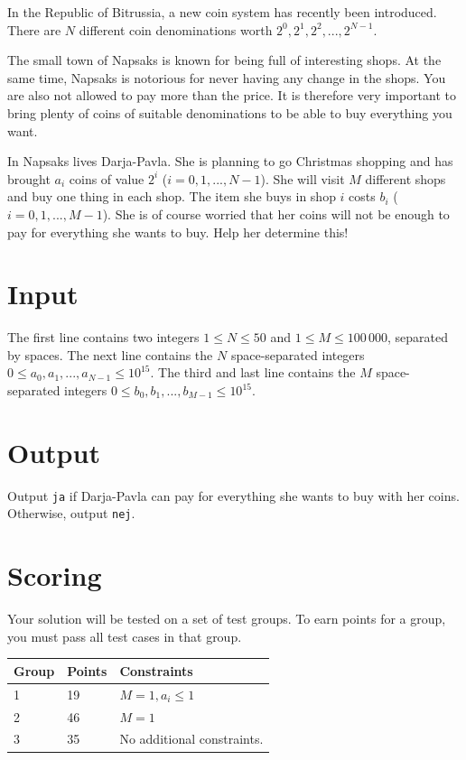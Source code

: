 In the Republic of Bitrussia, a new coin system has recently been introduced.
There are $N$ different coin denominations worth $2^0, 2^1, 2^2, ..., 2^{N-1}$.

The small town of Napsaks is known for being full of interesting shops.
At the same time, Napsaks is notorious for never having any change in the shops.
You are also not allowed to pay more than the price.
It is therefore very important to bring plenty of coins of suitable denominations to be able to buy everything you want.

In Napsaks lives Darja-Pavla.
She is planning to go Christmas shopping and has brought $a_i$ coins of value $2^i$ ($i = 0, 1, ..., N-1$).
She will visit $M$ different shops and buy one thing in each shop.
The item she buys in shop $i$ costs $b_i$ ($i = 0, 1, ..., M-1$).
She is of course worried that her coins will not be enough to pay for everything she wants to buy. Help her determine this!

\section*{Input}
The first line contains two integers $1 \le N \le 50$ and $1 \le M \le 100\,000$, separated by spaces.
The next line contains the $N$ space-separated integers $0 \le a_0, a_1, ..., a_{N-1} \le 10^{15}$.
The third and last line contains the $M$ space-separated integers $0 \le b_0, b_1, ..., b_{M-1} \le 10^{15}$.

\section*{Output}
Output \texttt{ja} if Darja-Pavla can pay for everything she wants to buy with her coins.
Otherwise, output \texttt{nej}.

\section*{Scoring}
Your solution will be tested on a set of test groups. To earn points for a group, you must pass all test cases in that group.

\noindent
\begin{tabular}{| l | l | l |}
\hline
Group & Points & Constraints \\ \hline
1     & 19         & $M = 1, a_i \le 1$ \\ \hline
2     & 46         & $M = 1$ \\ \hline
3     & 35         & No additional constraints. \\ \hline
\end{tabular}

